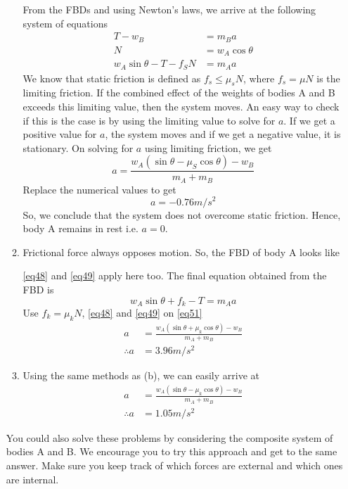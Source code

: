 \begin{enumerate}
\begin{enumerate}
From the FBDs and using Newton's laws, we arrive at the following system of equations
\begin{align}
T-w_B &= m_B a	\label{eq48}\\
N&= w_A\cos\theta	\label{eq49}\\
w_A\sin\theta - T - f_S N &= m_A a	\label{eq50}
\end{align}
We know that static friction is defined as $f_s \leq \mu_s N$, where $f_s=\mu N$ is the limiting friction. If the combined effect of the weights of bodies A and B exceeds this limiting value, then the system moves. An easy way to check if this is the case is by using the limiting value to solve for $a$. If we get a positive value for $a$, the system moves and if we get a negative value, it is stationary.
On solving for $a$ using limiting friction, we get
\begin{equation*}
a=\frac{w_A(\sin\theta - \mu_S \cos\theta)-w_B}{m_A+m_B}
\end{equation*}
Replace the numerical values to get
\[
a=-0.76 \si{m/s^2}
\]
So, we conclude that the system does not overcome static friction. Hence, body A remains in rest i.e. $a=0$.

\item Frictional force always opposes motion. So, the FBD of body A looks like
\begin{figure}[hbt]
    \centering
    
\end{figure}

\eqref{eq48} and \eqref{eq49} apply here too. The final equation obtained from the FBD is
\begin{equation}
w_A\sin\theta + f_k - T = m_A a	\label{eq51}
\end{equation}
Use $f_k=\mu_kN$, \eqref{eq48} and \eqref{eq49} on \eqref{eq51}
\begin{align*}
a&=\frac{w_A(\sin\theta + \mu_k \cos\theta)-w_B}{m_A+m_B}\\
\therefore a&=3.96 \si{m/s^2}
\end{align*}

\item Using the same methods as (b), we can easily arrive at 
\begin{align*}
a&=\frac{w_A(\sin\theta - \mu_k \cos\theta)-w_B}{m_A+m_B}\\
\therefore a&=1.05 \si{m/s^2}
\end{align*}

\end{enumerate}

You could also solve these problems by considering the composite system of bodies A and B. We encourage you to try this approach and get to the same answer. Make sure you keep track of which forces are external and which ones are internal.

\end{enumerate}

